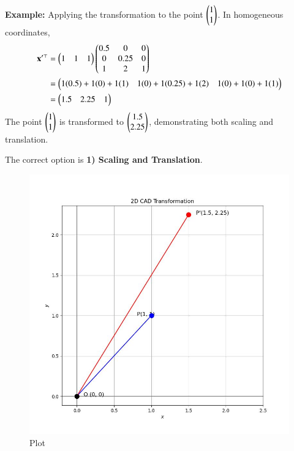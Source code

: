 \documentclass[journal]{IEEEtran}
\begin{document}
\textbf{Example:} Applying the transformation to the point $\begin{pmatrix}1 \\ 1\end{pmatrix}$. In homogeneous coordinates,
\begin{align}
    \mathbf{x}'^\top &= \begin{pmatrix}1 & 1 & 1\end{pmatrix} \begin{pmatrix}0.5 & 0 & 0 \\ 0 & 0.25 & 0 \\ 1 & 2 & 1\end{pmatrix} \\
    &= \begin{pmatrix}1(0.5)+1(0)+1(1) & 1(0)+1(0.25)+1(2) & 1(0)+1(0)+1(1)\end{pmatrix} \\
    &= \begin{pmatrix}1.5 & 2.25 & 1\end{pmatrix}
\end{align}
The point $\begin{pmatrix}1 \\ 1\end{pmatrix}$ is transformed to $\begin{pmatrix}1.5 \\ 2.25\end{pmatrix}$, demonstrating both scaling and translation.

The correct option is \textbf{1) Scaling and Translation}.

\begin{figure}[h!]
    \centering
    \includegraphics[width=\columnwidth]{figs/plot_p.jpg}
    \caption*{Plot}
    \label{fig:fig}
\end{figure}
\end{document}

